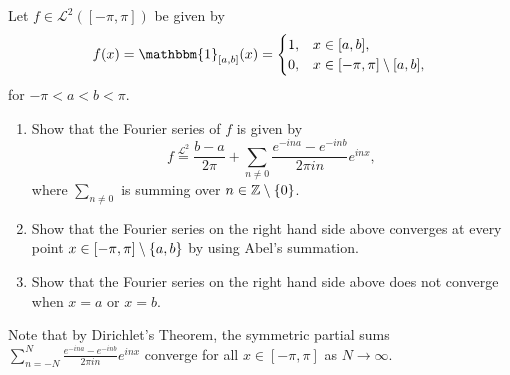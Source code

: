 \documentclass[11pt,a4paper]{article}
\begin{document}
\begin{exercise}
  Let $f \in \mathcal L^2([-\pi,\pi])$ be given by
  \[
    f(x) = \mathbbm{1}_{[a,b]}(x) =
    \begin{cases}
      1, & x \in [a,b], \\
      0, & x \in [-\pi,\pi] \setminus [a,b],
    \end{cases}
  \]
  for $-\pi < a < b < \pi$.
  \begin{enumerate}
    \item[(1)] Show that the Fourier series of $f$ is given by
      \[
        f \overset{\mathcal L^2}{=}
        \frac{b - a}{2\pi} +
        \sum_{n \neq 0} \frac{e^{- i n a} - e^{- i n b}}{2 \pi i n} e^{i n x},
      \]
      where $\sum_{n \neq 0}$ is summing over $n \in \mathbb{Z} \setminus \left\{0\right\}$.
    \item[(2)] Show that the Fourier series on the right hand side above
      converges at every point $x \in [-\pi,\pi] \setminus \left\{a,b\right\}$
      by using Abel's summation.
    \item[(3*)] Show that the Fourier series on the right hand
      side above does not converge when $x = a$ or $x = b$.
  \end{enumerate}
  Note that by Dirichlet’s Theorem, the symmetric partial sums
  $\sum_{n=-N}^{N} \frac{e^{- i n a} - e^{- i n b}}{2 \pi i n} e^{i n x}$
  converge for all $x \in [-\pi,\pi]$ as $N \to \infty$.
\end{exercise}
\end{document}
